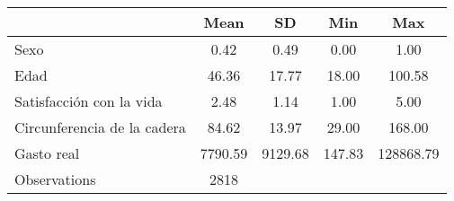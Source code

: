 {
\def\sym#1{\ifmmode^{#1}\else\(^{#1}\)\fi}
\begin{tabular}{l*{1}{cccc}}
\hline\hline
                    &        Mean&          SD&         Min&         Max\\
\hline
Sexo                &        0.42&        0.49&        0.00&        1.00\\
Edad                &       46.36&       17.77&       18.00&      100.58\\
Satisfacción con la vida&        2.48&        1.14&        1.00&        5.00\\
Circunferencia de la cadera&       84.62&       13.97&       29.00&      168.00\\
Gasto real          &     7790.59&     9129.68&      147.83&   128868.79\\
\hline
Observations        &        2818&            &            &            \\
\hline\hline
\end{tabular}
}
